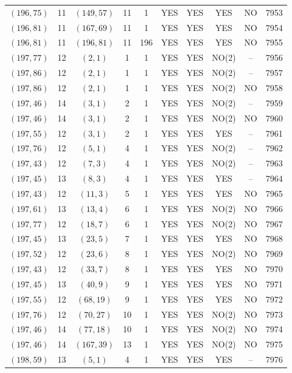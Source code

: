 \begin{longtable}{|c|c|c|c|c|c|c|c|c|c|}
$(196, 75)$ & 11 & $(149, 57)$ & 11 & 1 & YES & YES & YES & NO & 7953\\
$(196, 81)$ & 11 & $(167, 69)$ & 11 & 1 & YES & YES & YES & NO & 7954\\
$(196, 81)$ & 11 & $(196, 81)$ & 11 & 196 & YES & YES & YES & NO & 7955\\
$(197, 77)$ & 12 & $(2, 1)$ & 1 & 1 & YES & YES & NO(2) & -- & 7956\\
$(197, 86)$ & 12 & $(2, 1)$ & 1 & 1 & YES & YES & NO(2) & -- & 7957\\
$(197, 86)$ & 12 & $(2, 1)$ & 1 & 1 & YES & YES & NO(2) & NO & 7958\\
$(197, 46)$ & 14 & $(3, 1)$ & 2 & 1 & YES & YES & NO(2) & -- & 7959\\
$(197, 46)$ & 14 & $(3, 1)$ & 2 & 1 & YES & YES & NO(2) & NO & 7960\\
$(197, 55)$ & 12 & $(3, 1)$ & 2 & 1 & YES & YES & YES & -- & 7961\\
$(197, 76)$ & 12 & $(5, 1)$ & 4 & 1 & YES & YES & NO(2) & -- & 7962\\
$(197, 43)$ & 12 & $(7, 3)$ & 4 & 1 & YES & YES & NO(2) & -- & 7963\\
$(197, 45)$ & 13 & $(8, 3)$ & 4 & 1 & YES & YES & YES & -- & 7964\\
$(197, 43)$ & 12 & $(11, 3)$ & 5 & 1 & YES & YES & YES & NO & 7965\\
$(197, 61)$ & 13 & $(13, 4)$ & 6 & 1 & YES & YES & NO(2) & NO & 7966\\
$(197, 77)$ & 12 & $(18, 7)$ & 6 & 1 & YES & YES & NO(2) & NO & 7967\\
$(197, 45)$ & 13 & $(23, 5)$ & 7 & 1 & YES & YES & YES & NO & 7968\\
$(197, 52)$ & 12 & $(23, 6)$ & 8 & 1 & YES & YES & NO(2) & NO & 7969\\
$(197, 43)$ & 12 & $(33, 7)$ & 8 & 1 & YES & YES & YES & NO & 7970\\
$(197, 45)$ & 13 & $(40, 9)$ & 9 & 1 & YES & YES & YES & NO & 7971\\
$(197, 55)$ & 12 & $(68, 19)$ & 9 & 1 & YES & YES & YES & NO & 7972\\
$(197, 76)$ & 12 & $(70, 27)$ & 10 & 1 & YES & YES & NO(2) & NO & 7973\\
$(197, 46)$ & 14 & $(77, 18)$ & 10 & 1 & YES & YES & NO(2) & NO & 7974\\
$(197, 46)$ & 14 & $(167, 39)$ & 13 & 1 & YES & YES & NO(2) & NO & 7975\\
$(198, 59)$ & 13 & $(5, 1)$ & 4 & 1 & YES & YES & YES & -- & 7976\\

\end{longtable}
